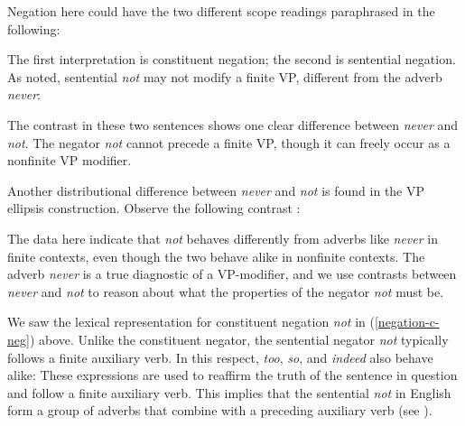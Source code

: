 \documentclass[output=paper
                ,modfonts
                ,nonflat
	        ,collection
	        ,collectionchapter
	        ,collectiontoclongg
 	        ,biblatex
                ,babelshorthands
                ,newtxmath
                ,draftmode
                ,colorlinks, citecolor=brown
]{./langsci/langscibook}
\begin{document}
{\begin{exe}
\begin{xlist}
\begin{exe}
\begin{xlist}
\z
%
Negation here could have the two different scope readings
paraphrased in the following:


\eal
{}
\zl
%
The first interpretation is constituent negation; the second is
sentential negation. As noted, sentential \textit{not} may not modify a finite
VP, different from the adverb \textit{never}:



\eal
{}
\zl
%
The contrast in these two sentences
shows one clear difference between \textit{never}
and \textit{not}. The negator \textit{not} cannot
precede a finite VP, though it can freely occur
as a nonfinite VP modifier.
%
%
%
%

Another distributional difference between \textit{never} and \textit{not} is found in
the VP ellipsis construction.  Observe the following
contrast \citep{KS:02}:

\eal
\label{negation-vpe-not-ex}
\zl
%
\noindent The data here indicate that \textit{not} behaves differently from
adverbs like \textit{never} in finite contexts, even though the two
behave alike in nonfinite contexts. The adverb \textit{never} is a true
diagnostic of a VP-modifier, and we use contrasts between \textit{never} and \textit{not} to reason about what the properties of
the negator \textit{not} must be.


We saw the lexical representation for constituent negation
\textit{not} in (\ref{negation-c-neg}) above. Unlike the
constituent negator, the sentential negator \textit{not} typically
 follows a finite auxiliary verb. In this respect,
   \textit{too}, \textit{so}, and \textit{indeed} also behave alike:
\eal
{}
\zl
%
These expressions are used to
reaffirm the truth of the sentence in question and
follow a finite auxiliary verb.  This implies
that the sentential {\it not} in English
form a group of adverbs that combine with a
preceding auxiliary verb (see \citealt{Kim:00}).


\end{xlist}
\end{exe}
\end{xlist}
\end{exe}}
\end{document}
